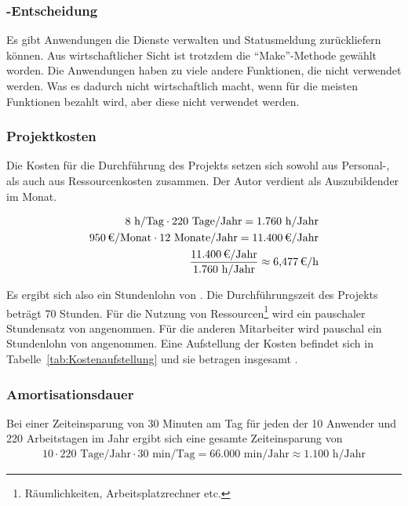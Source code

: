 \subsubsection{-Entscheidung}
\label{sec:MakeOrBuyEntscheidung}

Es gibt Anwendungen die Dienste verwalten und Statusmeldung zurückliefern können. Aus wirtschaftlicher Sicht ist trotzdem die “Make”-Methode gewählt worden. Die Anwendungen haben zu viele andere Funktionen, die nicht verwendet werden. Was es dadurch nicht wirtschaftlich macht, wenn für die meisten Funktionen bezahlt wird, aber diese nicht verwendet werden.

\subsubsection{Projektkosten}
\label{sec:Projektkosten}

Die Kosten für die Durchführung des Projekts setzen sich sowohl aus Personal-, als auch aus Ressourcenkosten zusammen. Der Autor verdient als Auszubildender  im Monat. 

\begin{eqnarray}
8 \mbox{ h/Tag} \cdot 220 \mbox{ Tage/Jahr} = 1.760 \mbox{ h/Jahr}\\
\eur{950}\mbox{/Monat} \cdot 12 \mbox{ Monate/Jahr} = \eur{11.400} \mbox{/Jahr}\\
\frac{\eur{11.400} \mbox{/Jahr}}{1.760 \mbox{ h/Jahr}} \approx \eur{6,477}\mbox{/h}
\end{eqnarray}

Es ergibt sich also ein Stundenlohn von . 
Die Durchführungszeit des Projekts beträgt 70 Stunden. Für die Nutzung von Ressourcen\footnote{Räumlichkeiten, Arbeitsplatzrechner etc.} wird 
ein pauschaler Stundensatz von  angenommen. Für die anderen Mitarbeiter wird pauschal ein Stundenlohn von  angenommen. 
Eine Aufstellung der Kosten befindet sich in Tabelle~\ref{tab:Kostenaufstellung} und sie betragen insgesamt .

\subsubsection{Amortisationsdauer}
\label{sec:Amortisationsdauer}

Bei einer Zeiteinsparung von 30 Minuten am Tag für jeden der 10 Anwender und 220 Arbeitstagen im Jahr ergibt sich eine gesamte Zeiteinsparung von 
\begin{eqnarray}
10 \cdot 220 \mbox{ Tage/Jahr} \cdot 30 \mbox{ min/Tag} = 66.000 \mbox{ min/Jahr} \approx 1.100 \mbox{ h/Jahr} 
\end{eqnarray}

